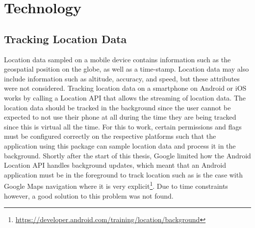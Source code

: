 \section{Technology}

\subsection{Tracking Location Data}
Location data sampled on a mobile device contains information such as the geospatial position on the globe, as well as a time-stamp. Location data may also include information such as altitude, accuracy, and speed, but these attributes were not considered. Tracking location data on a smartphone on Android or iOS works by calling a Location API that allows the streaming of location data. The location data should be tracked in the background since the user cannot be expected to not use their phone at all during the time they are being tracked since this is virtual all the time. For this to work, certain permissions and flags must be configured correctly on the respective platforms such that the application using this package can sample location data and process it in the background. Shortly after the start of this thesis, Google limited how the Android Location API handles background updates, which meant that an Android application must be in the foreground to track location such as is the case with Google Maps navigation where it is very explicit\footnote{\url{https://developer.android.com/training/location/background}}. Due to time constraints however, a good solution to this problem was not found.

